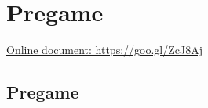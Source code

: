 \chapter{Pregame}
\label{appendix:pregame}

\href{https://goo.gl/ZcJ8Aj}{Online document: https://goo.gl/ZcJ8Aj}

\section*{Pregame}

